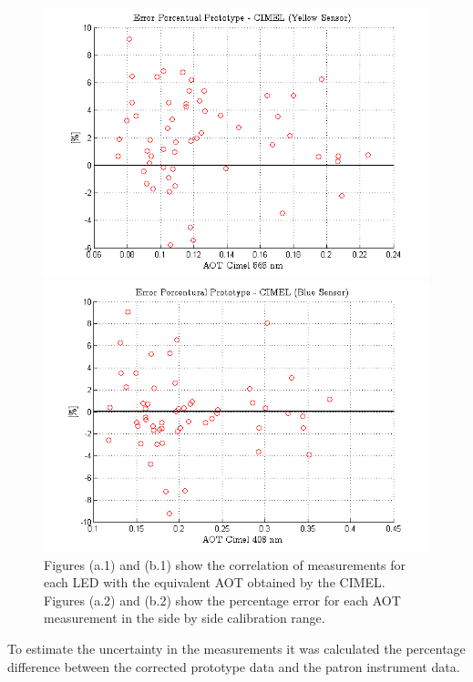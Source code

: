 \documentclass[12pt,letterpaper]{article}
\numberwithin{figure}{section}
\numberwithin{equation}{section}
\numberwithin{table}{section}
\begin{document}
\begin{figure}[!htb]
\begin{minipage}{.5\textwidth}
        \centering
        \includegraphics[width=\linewidth]{Figuras/error_amarillo.png}   
    \end{minipage}%
    \begin{minipage}{0.5\textwidth}
        \centering
        \includegraphics[width=\linewidth]{Figuras/error_azul.png} 
    \end{minipage}
    \caption{Figures (a.1) and (b.1) show the correlation of measurements for each LED with the equivalent AOT obtained by the CIMEL. Figures (a.2) and (b.2) show the percentage error for each AOT measurement in the side by side calibration range.}
    \label{fig:58}
\end{figure}

To estimate the uncertainty in the measurements it was calculated the percentage difference between the corrected prototype data and the patron instrument data. 
\end{document}
